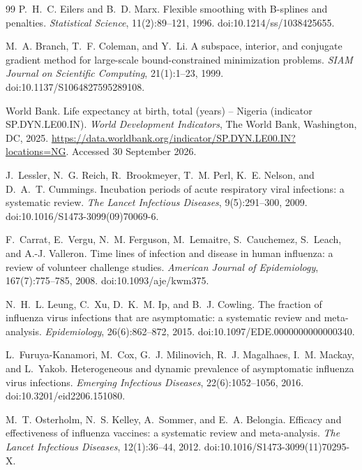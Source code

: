 \documentclass[12pt,a4paper]{article}
\theoremstyle{definition}
\theoremstyle{remark}
\begin{document}
\begin{thebibliography}{99}
P.~H.~C. Eilers and B.~D. Marx.
\newblock Flexible smoothing with {B}-splines and penalties.
\newblock \emph{Statistical Science}, 11(2):89--121, 1996.
\newblock doi:10.1214/ss/1038425655.

M.~A. Branch, T.~F. Coleman, and Y.~Li.
\newblock A subspace, interior, and conjugate gradient method for large-scale bound-constrained minimization problems.
\newblock \emph{SIAM Journal on Scientific Computing}, 21(1):1--23, 1999.
\newblock doi:10.1137/S1064827595289108.


World Bank.
\newblock Life expectancy at birth, total (years) -- Nigeria (indicator SP.DYN.LE00.IN).
\newblock \emph{World Development Indicators}, The World Bank, Washington, DC, 2025.
\newblock \url{https://data.worldbank.org/indicator/SP.DYN.LE00.IN?locations=NG}. Accessed 30 September 2026.

J.~Lessler, N.~G. Reich, R.~Brookmeyer, T.~M. Perl, K.~E. Nelson, and D.~A.~T. Cummings.
\newblock Incubation periods of acute respiratory viral infections: a systematic review.
\newblock \emph{The Lancet Infectious Diseases}, 9(5):291--300, 2009.
\newblock doi:10.1016/S1473-3099(09)70069-6.

F.~Carrat, E.~Vergu, N.~M. Ferguson, M.~Lemaitre, S.~Cauchemez, S.~Leach, and A.-J. Valleron.
\newblock Time lines of infection and disease in human influenza: a review of volunteer challenge studies.
\newblock \emph{American Journal of Epidemiology}, 167(7):775--785, 2008.
\newblock doi:10.1093/aje/kwm375.

N.~H.~L. Leung, C.~Xu, D.~K.~M. Ip, and B.~J. Cowling.
\newblock The fraction of influenza virus infections that are asymptomatic: a systematic review and meta-analysis.
\newblock \emph{Epidemiology}, 26(6):862--872, 2015.
\newblock doi:10.1097/EDE.0000000000000340.

L.~Furuya-Kanamori, M.~Cox, G.~J. Milinovich, R.~J. Magalhaes, I.~M. Mackay, and L.~Yakob.
\newblock Heterogeneous and dynamic prevalence of asymptomatic influenza virus infections.
\newblock \emph{Emerging Infectious Diseases}, 22(6):1052--1056, 2016.
\newblock doi:10.3201/eid2206.151080.

M.~T. Osterholm, N.~S. Kelley, A.~Sommer, and E.~A. Belongia.
\newblock Efficacy and effectiveness of influenza vaccines: a systematic review and meta-analysis.
\newblock \emph{The Lancet Infectious Diseases}, 12(1):36--44, 2012.
\newblock doi:10.1016/S1473-3099(11)70295-X.


\end{thebibliography}
\end{document}
